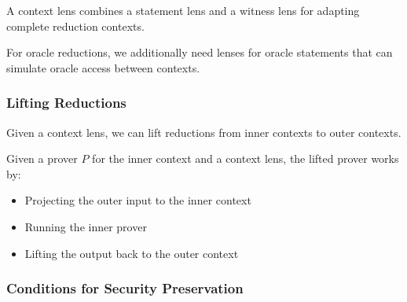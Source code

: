 \begin{definition}
    \label{def:context_lens}
    A context lens combines a statement lens and a witness lens for adapting complete reduction contexts.
\end{definition}

\begin{definition}
    \label{def:oracle_context_lens}
    For oracle reductions, we additionally need lenses for oracle statements that can simulate oracle access between contexts.
\end{definition}

\subsubsection{Lifting Reductions}

Given a context lens, we can lift reductions from inner contexts to outer contexts.

\begin{definition}
    \label{def:prover_lift_context}
    Given a prover $P$ for the inner context and a context lens, the lifted prover works by:
    \begin{itemize}
        \item Projecting the outer input to the inner context
        \item Running the inner prover
        \item Lifting the output back to the outer context
    \end{itemize}
\end{definition}

\begin{definition}
    \label{def:verifier_lift_context}
\end{definition}

\begin{definition}
    \label{def:reduction_lift_context}
\end{definition}

\subsubsection{Conditions for Security Preservation}

